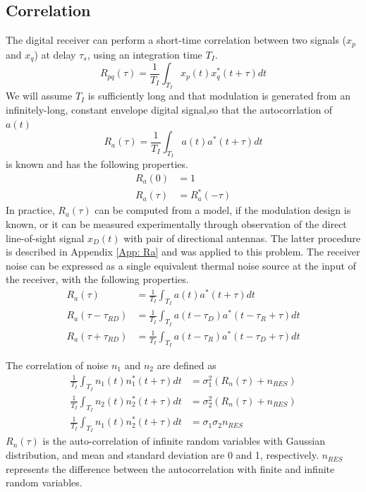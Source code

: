 \documentclass[draftcls,onecolumn]{IEEEtran}  %
\begin{document}
\subsection{Correlation}
The digital receiver can perform a short-time correlation between two signals ($x_p$ and $x_q$) at delay $\tau_s$, using an integration time $T_I$. 
\begin{equation}
	R_{pq}(\tau)  %
    =\frac{1}{T_I} \int_{T_I}x_p(t) x_q^*(t+\tau)dt 
    \label{Eq: correlation_def}
\end{equation}
We will assume $T_I$ is sufficiently long and that modulation is generated from an infinitely-long, constant envelope digital signal,so that the autocorrlation of $a(t)$ \begin{equation}
R_a (\tau) = \frac{1}{T_I} \int_{T_I} a(t) a^*(t+\tau) dt
\end{equation}
is known and has the following properties.
\begin{align}
   \label{eqn:acfa1}
	R_{a}(0) &= 1   \\
    R_{a}(\tau) & = R_a^* (-\tau)
    \label{eqn:acfa2}
\end{align}
In practice, $R_a(\tau)$ can be computed from a model, if the modulation design is known, or it can be measured experimentally through observation of the direct line-of-sight signal $x_D(t)$ with pair of directional antennas.  The latter procedure is described in Appendix \ref{App: Ra} and was applied to this problem.  The receiver noise can be expressed as a single equivalent thermal noise source at the input of the receiver, with the following properties.
\begin{equation}
\begin{split}
	R_a(\tau)&=\frac{1}{T_I} \int_{T_I}a(t) a^*(t+\tau)dt  \\
    R_a(\tau-\tau_{RD})&=\frac{1}{T_I} \int_{T_I}a(t-\tau_D) a^*(t-\tau_R+\tau)dt  \\
    R_a(\tau+\tau_{RD})&=\frac{1}{T_I} \int_{T_I}a(t-\tau_R) a^*(t-\tau_D+\tau)dt 
 \end{split}
\end{equation}

The correlation of noise $n_1$ and $n_2$ are defined as
\begin{equation}
\begin{split}
    \frac{1}{T_I} \int_{T_I}n_1(t) n_1^*(t+\tau)dt  &=  \sigma_1^2 (R_n(\tau) + n_{RES})\\
	\frac{1}{T_I} \int_{T_I}n_2(t) n_2^*(t+\tau)dt  &=  \sigma_2^2 (R_n(\tau) + n_{RES})\\
    \frac{1}{T_I} \int_{T_I}n_1(t) n_2^*(t+\tau)dt  &=  \sigma_1 \sigma_2  n_{RES}
 \end{split}
\end{equation}
$R_n(\tau)$ is the auto-correlation of infinite random variables with Gaussian distribution, and mean and standard deviation are 0 and 1, respectively. $n_{RES}$ represents the difference between the autocorrelation with finite and infinite random variables.
	
\end{document}
